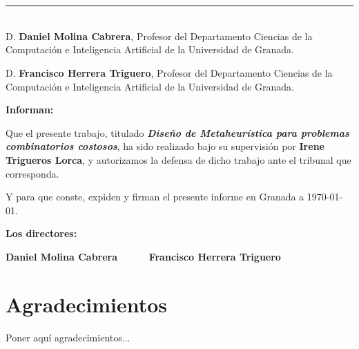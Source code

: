 \chapter*{}
\thispagestyle{empty}

\noindent\rule[-1ex]{\textwidth}{2pt}\\[4.5ex]

D. \textbf{Daniel Molina Cabrera}, Profesor del Departamento Ciencias de la Computación e Inteligencia Artificial de la Universidad de Granada.

\vspace{0.5cm}

D. \textbf{Francisco Herrera Triguero}, Profesor del Departamento Ciencias de la Computación e Inteligencia Artificial de la Universidad de Granada.


\vspace{0.5cm}

\textbf{Informan:}

\vspace{0.5cm}

Que el presente trabajo, titulado \textit{\textbf{Diseño de Metaheurística para problemas combinatorios costosos}},
ha sido realizado bajo su supervisión por \textbf{Irene Trigueros Lorca}, y autorizamos la defensa de dicho trabajo ante el tribunal
que corresponda.

\vspace{0.5cm}

Y para que conste, expiden y firman el presente informe en Granada a \today.

\vspace{1cm}

\textbf{Los directores:}

\vspace{5cm}

\noindent \textbf{Daniel Molina Cabrera \ \ \ \ \ Francisco Herrera Triguero}

\chapter*{Agradecimientos}
\thispagestyle{empty}

       \vspace{1cm}


Poner aquí agradecimientos...

